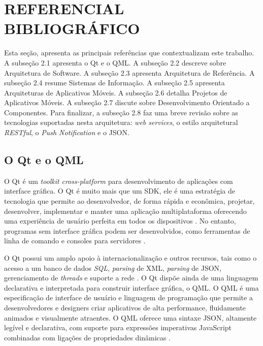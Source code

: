 \section{REFERENCIAL BIBLIOGRÁFICO}
Esta seção, apresenta as principais referências que contextualizam este trabalho. A subseção 2.1 apresenta o Qt e o QML. A subseção 2.2 descreve sobre Arquitetura de Software. A subseção 2.3 apresenta Arquitetura de Referência. A subseção 2.4 resume Sistemas de Informação. A subseção 2.5 apresenta Arquiteturas de Aplicativos Móveis. A subseção 2.6 detalha Projetos de Aplicativos Móveis. A subseção 2.7 discute sobre Desenvolvimento Orientado a Componentes. Para finalizar, a subseção 2.8 faz uma breve revisão sobre as tecnologias suportadas nesta arquitetura: \textit{web services}, o estilo arquitetural \textit{RESTful}, o \textit{Push Notification} e o JSON.


\subsection{O Qt e o QML} %
O Qt é um \textit{toolkit} \textit{cross-platform} para desenvolvimento de aplicações com interface gráfica. O Qt é muito mais que um SDK, ele é uma estratégia de tecnologia que permite ao desenvolvedor, de forma rápida e econômica, projetar, desenvolver, implementar e manter uma aplicação multiplataforma oferecendo uma experiência de usuário perfeita em todos os dispositivos \cite{qt_io}. No entanto, programas sem interface gráfica podem ser desenvolvidos, como ferramentas de linha de comando e consoles para servidores \cite{qt_software}.\par

O Qt possui um amplo apoio à internacionalização e outros recursos, tais como o acesso a um banco de dados \textit{SQL}, \textit{parsing} de XML, \textit{parsing} de JSON, gerenciamento de \textit{threads} e suporte a rede \cite{qt_gui_toolkit}. O Qt dispõe ainda de uma linguagem declarativa e interpretada para construir interface gráfica, o QML. O QML é uma especificação de interface de usuário e linguagem de programação que permite a desenvolvedores e designers criar aplicativos de alta performance, fluidamente animados e visualmente atraentes. O QML oferece uma sintaxe JSON, altamente legível e declarativa, com suporte para expressões imperativas JavaScript combinadas com ligações de propriedades dinâmicas \cite{doc_qt_io}.


